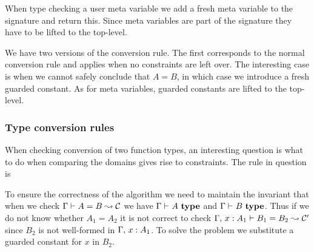 When type checking a user meta variable we add a fresh meta variable to the
signature and return this. Since meta variables are part of the signature they
have to be lifted to the top-level.

We have two versions of the conversion rule. The first corresponds to the
normal conversion rule and applies when no constraints are left over. The
interesting case is when we cannot safely conclude that $A = B$, in which case
we introduce a fresh guarded constant. As for meta variables, guarded constants
are lifted to the top-level.

\subsubsection{Type conversion rules}

When checking conversion of two function types, an interesting question is what
to do when comparing the domains gives rise to constraints. The rule in question is


To ensure the correctness of the algorithm we need to maintain the invariant
that when we check ${\Gamma} \vdash {A} = {B} \leadsto {\mathcal{C}}$ we have ${\Gamma} \vdash_{}A ~ \mathbf{type}$ and
${\Gamma} \vdash_{}B ~ \mathbf{type}$. Thus if we do not know whether $A_1 = A_2$ it is not
correct to check ${{\Gamma},\,{} x : A_1} \vdash {B_1} = {B_2} \leadsto {\mathcal{C}^\prime}$
since $B_2$ is not well-formed in ${\Gamma},\,{} x : A_1$. To solve the problem
we substitute a guarded constant for $x$ in $B_2$.

% 
% 
% 
% 
% 

